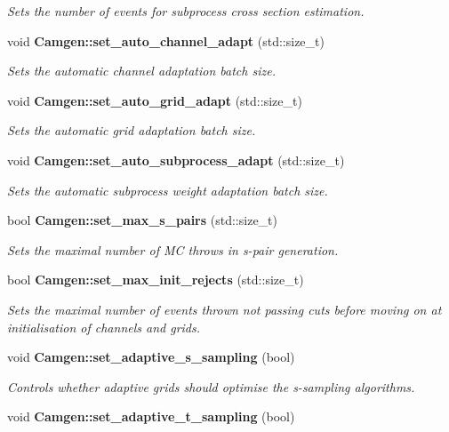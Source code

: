 \begin{DoxyCompactItemize}
\begin{DoxyCompactList}\small\item\em Sets the number of events for subprocess cross section estimation. \end{DoxyCompactList}\item 
void {\bfseries Camgen\-::set\-\_\-auto\-\_\-channel\-\_\-adapt} (std\-::size\-\_\-t)
\begin{DoxyCompactList}\small\item\em Sets the automatic channel adaptation batch size. \end{DoxyCompactList}\item 
void {\bfseries Camgen\-::set\-\_\-auto\-\_\-grid\-\_\-adapt} (std\-::size\-\_\-t)
\begin{DoxyCompactList}\small\item\em Sets the automatic grid adaptation batch size. \end{DoxyCompactList}\item 
void {\bfseries Camgen\-::set\-\_\-auto\-\_\-subprocess\-\_\-adapt} (std\-::size\-\_\-t)
\begin{DoxyCompactList}\small\item\em Sets the automatic subprocess weight adaptation batch size. \end{DoxyCompactList}\item 
bool {\bfseries Camgen\-::set\-\_\-max\-\_\-s\-\_\-pairs} (std\-::size\-\_\-t)
\begin{DoxyCompactList}\small\item\em Sets the maximal number of M\-C throws in s-\/pair generation. \end{DoxyCompactList}\item 
bool {\bfseries Camgen\-::set\-\_\-max\-\_\-init\-\_\-rejects} (std\-::size\-\_\-t)
\begin{DoxyCompactList}\small\item\em Sets the maximal number of events thrown not passing cuts before moving on at initialisation of channels and grids. \end{DoxyCompactList}\item 
void {\bfseries Camgen\-::set\-\_\-adaptive\-\_\-s\-\_\-sampling} (bool)
\begin{DoxyCompactList}\small\item\em Controls whether adaptive grids should optimise the s-\/sampling algorithms. \end{DoxyCompactList}\item 
void {\bfseries Camgen\-::set\-\_\-adaptive\-\_\-t\-\_\-sampling} (bool)

\end{DoxyCompactItemize}
